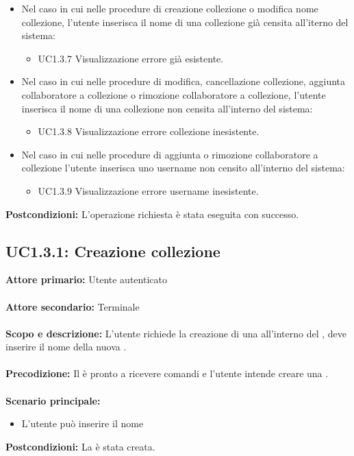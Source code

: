 \documentclass{scalatekids-article}
\begin{document}
\begin{itemize}
\item Nel caso in cui nelle procedure di creazione collezione o modifica nome collezione, l'utente inserisca il nome di una collezione già censita all'iterno del sistema:
  \begin{itemize}
  \item UC1.3.7 Visualizzazione errore  già esistente.
  \end{itemize}
\item Nel caso in cui nelle procedure di modifica, cancellazione collezione, aggiunta collaboratore a collezione o rimozione collaboratore a collezione, l'utente inserisca il nome di una collezione non censita all'interno del sistema:
  \begin{itemize}
  \item UC1.3.8 Visualizzazione errore collezione inesistente.
  \end{itemize}
\item Nel caso in cui nelle procedure di aggiunta o rimozione collaboratore a collezione l'utente inserisca uno username non censito all'interno del sistema:
  \begin{itemize}
  \item UC1.3.9 Visualizzazione errore username inesistente.
  \end{itemize}
\end{itemize}
\textbf{Postcondizioni:} L'operazione richiesta è stata eseguita con successo.

\subsection{UC1.3.1: Creazione collezione}

\textbf{Attore primario:} Utente autenticato\\ \\
\textbf{Attore secondario:} Terminale\\ \\
\textbf{Scopo e descrizione:} L'utente richiede la creazione di una  all'interno del , deve inserire il nome della nuova .\\ \\
\textbf{Precodizione:} Il  è pronto a ricevere comandi e l'utente intende creare una .\\ \\
\textbf{Scenario principale:}
\begin{itemize}
\item L'utente può inserire il nome 
\end{itemize}
\textbf{Postcondizioni:} La  è stata creata.
\end{document}
